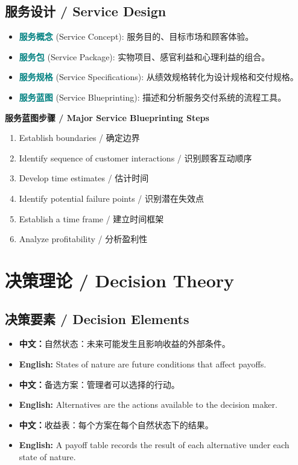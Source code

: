 \documentclass[11pt,a4paper]{ctexart}
\newcommand{\term}[2]{\textbf{\textcolor{Teal}{#1}} \textcolor{Muted}{(#2)}}
\newcommand{\cn}[1]{\textbf{中文：}#1}
\newcommand{\en}[1]{\textbf{English:} #1}
\begin{document}
\subsection{服务设计 / Service Design}
\begin{itemize}
  \item \term{服务概念}{Service Concept}: 服务目的、目标市场和顾客体验。
  \item \term{服务包}{Service Package}: 实物项目、感官利益和心理利益的组合。
  \item \term{服务规格}{Service Specifications}: 从绩效规格转化为设计规格和交付规格。
  \item \term{服务蓝图}{Service Blueprinting}: 描述和分析服务交付系统的流程工具。
\end{itemize}

\textbf{服务蓝图步骤 / Major Service Blueprinting Steps}
\begin{enumerate}
  \item Establish boundaries / 确定边界
  \item Identify sequence of customer interactions / 识别顾客互动顺序
  \item Develop time estimates / 估计时间
  \item Identify potential failure points / 识别潜在失效点
  \item Establish a time frame / 建立时间框架
  \item Analyze profitability / 分析盈利性
\end{enumerate}

\section{决策理论 / Decision Theory}

\subsection{决策要素 / Decision Elements}
\begin{itemize}
  \item \cn{自然状态：未来可能发生且影响收益的外部条件。}
  \item \en{States of nature are future conditions that affect payoffs.}
  \item \cn{备选方案：管理者可以选择的行动。}
  \item \en{Alternatives are the actions available to the decision maker.}
  \item \cn{收益表：每个方案在每个自然状态下的结果。}
  \item \en{A payoff table records the result of each alternative under each state of nature.}
\end{itemize}
\end{document}
